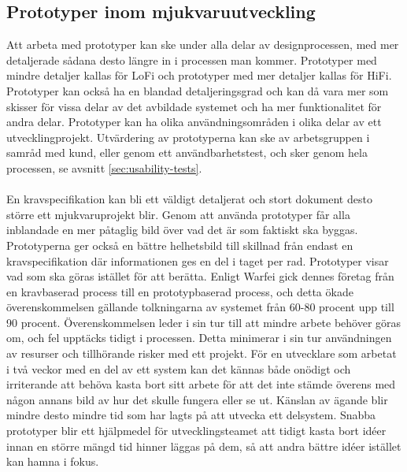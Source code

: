 \subsection{Prototyper inom mjukvaruutveckling}
Att arbeta med prototyper kan ske under alla delar av designprocessen, med mer detaljerade sådana desto längre in i processen man kommer. Prototyper med mindre detaljer kallas för LoFi och prototyper med mer detaljer kallas för HiFi. Prototyper kan också ha en blandad detaljeringsgrad och kan då vara mer som skisser för vissa delar av det avbildade systemet och ha mer funktionalitet för andra delar. Prototyper kan ha olika användningsområden i olika delar av ett utvecklingprojekt. \cite{effective-prototyping} %
Utvärdering av prototyperna kan ske av arbetsgruppen i samråd med kund, eller genom ett användbarhetstest, och sker genom hela processen, se avsnitt \ref{sec:usability-tests}.
\\ \\
En kravspecifikation kan bli ett väldigt detaljerat och stort dokument desto större ett mjukvaruprojekt blir. Genom att använda prototyper får alla inblandade en mer påtaglig bild över vad det är som faktiskt ska byggas. Prototyperna ger också en bättre helhetsbild till skillnad från endast en kravspecifikation där informationen ges en del i taget per rad. Prototyper visar vad som ska göras istället för att berätta. \cite{prototyping-guide} %
Enligt Warfei \cite{prototyping-guide} %
gick dennes företag från en kravbaserad process till en prototypbaserad process, och detta ökade överenskommelsen gällande tolkningarna av systemet från 60-80 procent upp till 90 procent. Överenskommelsen leder i sin tur till att mindre arbete behöver göras om, och fel upptäcks tidigt i processen. Detta minimerar i sin tur användningen av resurser och tillhörande risker med ett projekt. \cite{prototyping-guide} %
För en utvecklare som arbetat i två veckor med en del av ett system kan det kännas både onödigt och irriterande att behöva kasta bort sitt arbete för att det inte stämde överens med någon annans bild av hur det skulle fungera eller se ut. Känslan av ägande blir mindre desto mindre tid som har lagts på att utvecka ett delsystem. Snabba prototyper blir ett hjälpmedel för utvecklingsteamet att tidigt kasta bort idéer innan en större mängd tid hinner läggas på dem, så att andra bättre idéer istället kan hamna i fokus. \cite{paper-prototyping} %

